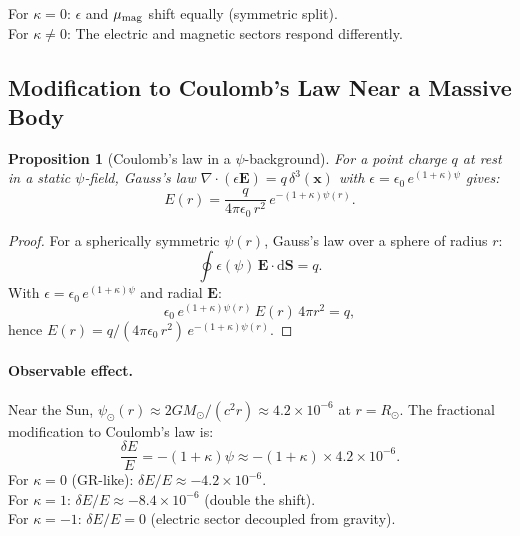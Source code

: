 \documentclass[11pt]{article}
\newtheorem{proposition}[theorem]{Proposition}
\newcommand{\dd}{\mathrm{d}}
\newcommand{\vE}{\mathbf{E}}
\newcommand{\vS}{\mathbf{S}}
\newcommand{\vx}{\mathbf{x}}
\begin{document}
For $\kappa = 0$: $\epsilon$ and $\mu_{\rm mag}$ shift equally (symmetric split).\\
For $\kappa \neq 0$: The electric and magnetic sectors respond differently.

\subsection{Modification to Coulomb's Law Near a Massive Body}

\begin{proposition}[Coulomb's law in a $\psi$-background]
\label{prop:coulomb}
For a point charge $q$ at rest in a static $\psi$-field, Gauss's law
$\nabla\cdot(\epsilon\vE) = q\,\delta^3(\vx)$ with
$\epsilon = \epsilon_0\, e^{(1+\kappa)\psi}$ gives:
\begin{equation}
\boxed{
E(r) = \frac{q}{4\pi\epsilon_0\, r^2}\, e^{-(1+\kappa)\psi(r)}.
}
\label{eq:coulomb-modified}
\end{equation}
\end{proposition}

\begin{proof}
For a spherically symmetric $\psi(r)$, Gauss's law over a sphere of radius $r$:
\begin{equation}
\oint \epsilon(\psi)\, \vE \cdot \dd\vS = q.
\end{equation}
With $\epsilon = \epsilon_0\, e^{(1+\kappa)\psi}$ and radial $\vE$:
\begin{equation}
\epsilon_0\, e^{(1+\kappa)\psi(r)}\, E(r)\, 4\pi r^2 = q,
\end{equation}
hence $E(r) = q/(4\pi\epsilon_0\, r^2)\, e^{-(1+\kappa)\psi(r)}$.
\end{proof}

\paragraph{Observable effect.}
Near the Sun, $\psi_\odot(r) \approx 2GM_\odot/(c^2 r) \approx 4.2\times 10^{-6}$
at $r = R_\odot$.  The fractional modification to Coulomb's law is:
\begin{equation}
\frac{\delta E}{E} = -(1+\kappa)\psi \approx -(1+\kappa)\times 4.2\times 10^{-6}.
\end{equation}
For $\kappa = 0$ (GR-like): $\delta E/E \approx -4.2\times 10^{-6}$.\\
For $\kappa = 1$: $\delta E/E \approx -8.4\times 10^{-6}$ (double the shift).\\
For $\kappa = -1$: $\delta E/E = 0$ (electric sector decoupled from gravity).
\end{document}
